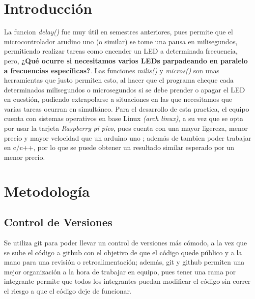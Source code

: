 \documentclass[journal, compsoc, 12pt]{IEEEtran}
\begin{document}

\begin{abstract}
  Desarrollo de la prácticca 1 de la materia de Interfaces Hombre-Máquina, adaptado para sistemas operativos base Linux y usando una Rasberry pi pico. 
  El código utilizado se puede encontrar en github:
\end{abstract}



\section{Introducción}
La funcion \textit{delay()} fue muy útil en semestres anteriores, pues permite que el microcontrolador arudino uno (o similar) se tome una pausa en milisegundos, permitiendo realizar tareas como encender un LED a determinada frecuencia, pero, \textbf{¿Qué ocurre si necesitamos varios LEDs parpadeando en paralelo a frecuencias específicas?}.
Las funciones \textit{milis()} y \textit{micros()} son unas herramientas que justo permiten esto, al hacer que el programa  cheque cada determinados milisegundos o microsegundos si se debe prender o apagar el LED en cuestión, pudiendo extrapolarse a situaciones en las que necesitamos que varias tareas ocurran en simultáneo.
Para el desarrollo de esta practica, el equipo cuenta con sistemas operativos en base Linux  \textit{(arch linux)}, a su vez que se opta por usar la tarjeta \textit{Raspberry pi pico}, pues cuenta con una mayor ligereza, menor precio y mayor velocidad que un arduino uno \cite{raspberrypi_pico_series}; además de tambien poder trabajar en c/c++, por lo que se puede obtener un resultado similar esperado por un menor precio.

\section{Metodología}
  \subsection{Control de Versiones}
  Se utiliza git para poder llevar un control de versiones más cómodo, a la vez que se sube el código a github con el objetivo de que el código quede público y a la mano para una revisión o retroalimentación; además, git y github permiten una mejor organización a la hora de trabajar en equipo, pues tener una rama por integrante permite que todos los integrantes puedan modificar el código sin correr el riesgo a que el código deje de funcionar.
\end{document}
